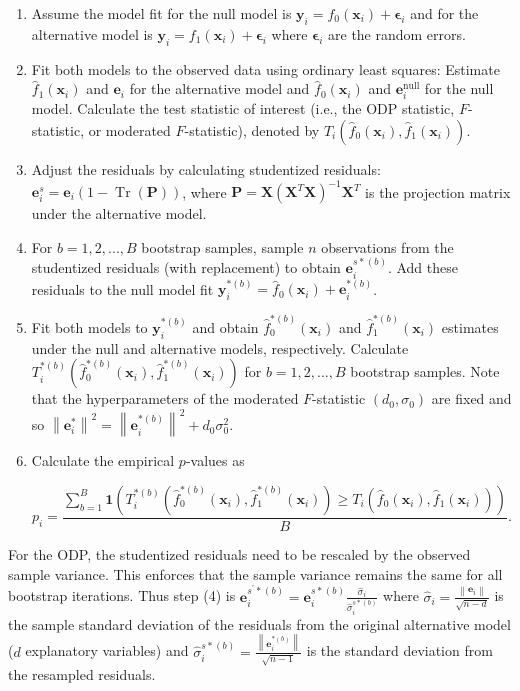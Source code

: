 \documentclass[11pt]{article}
\DeclareMathOperator{\Tr}{Tr}
\begin{document}
\begin{enumerate}
\item Assume the model fit for the null model is $\mathbf{y}_{i} = f_{0}(\mathbf{x}_{i}) + \mathbf{\epsilon}_{i}$ and for the alternative model is $\mathbf{y}_{i} = f_{1}(\mathbf{x}_{i}) + \mathbf{\epsilon}_{i}$ where $\mathbf{\epsilon}_{i}$ are the random errors.
\item Fit both models to the observed data using ordinary least squares: Estimate $\hat{f}_{1}(\mathbf{x}_{i})$ and $\mathbf{e}_{i}$ for the alternative model and $\hat{f}_{0}(\mathbf{x}_{i})$ and $\mathbf{e}_{i}^{\text{null}}$ for the null model. Calculate the test statistic of interest (i.e., the ODP statistic, $F$-statistic, or moderated $F$-statistic), denoted by $T_{i}(\hat{f}_{0}(\mathbf{x}_{i}), \hat{f}_{1}(\mathbf{x}_{i}))$.
\item Adjust the residuals by calculating studentized residuals: $\mathbf{e}^{s}_{i}= \mathbf{e}_{i}(1-\Tr(\mathbf{P}))$, where $\mathbf{P} = \mathbf{X}(\mathbf{X}^{T}\mathbf{X})^{-1}\mathbf{X}^{T}$ is the projection matrix under the alternative model.
\item For $b=1,2,...,B$ bootstrap samples, sample $n$ observations from the studentized residuals (with replacement) to obtain $\mathbf{e}^{s*(b)}_{i}$. Add these residuals to the null model fit $\mathbf{y}^{*(b)}_{i} = \hat{f}_{0}(\mathbf{x}_{i}) + \mathbf{e}^{*(b)}_{i}$.
\item  Fit both models to $\mathbf{y}^{*(b)}_{i}$ and obtain $\hat{f}^{*(b)}_{0}(\mathbf{x}_{i})$ and $\hat{f}^{*(b)}_{1}(\mathbf{x}_{i})$ estimates under the null and alternative models, respectively. Calculate $T^{*(b)}_{i}(\hat{f}^{*(b)}_{0}(\mathbf{x}_{i}), \hat{f}^{*(b)}_{1}(\mathbf{x}_{i}))$ for $b = 1,2,...,B$ bootstrap samples. Note that the hyperparameters of the moderated $F$-statistic $(d_{0}, \sigma_{0})$ are fixed and so $\left\lVert\mathbf{e}^{*}_{i}\right\rVert ^ {2} = \left\lVert \mathbf{e}^{*(b)}_{i} \right\rVert ^ {2} + d_{0}\sigma_{0}^{2}$.
\item Calculate the empirical $p$-values as

$$
p_{i} = \dfrac{\sum_{b=1}^{B} \mathbf{1}\left(T^{*(b)}_{i}(\hat{f}^{*(b)}_{0}(\mathbf{x}_{i}), \hat{f}^{*(b)}_{1}(\mathbf{x}_{i})) \geq T_{i}(\hat{f}_{0}(\mathbf{x}_{i}), \hat{f}_{1}(\mathbf{x}_{i}))\right) }{B}.
$$
\end{enumerate}

For the ODP, the studentized residuals need to be rescaled by the observed sample variance. This enforces that the sample variance remains the same for all bootstrap iterations. Thus step (4) is  $\mathbf{e}^{s^{\prime}*(b)}_{i} = \mathbf{e}^{s*(b)}_{i}\frac{\hat{\sigma}_{i} }{\hat{\sigma}^{s*(b)}_{i}}$ where $\hat{\sigma}_{i} = \frac{\left\lVert\mathbf{e}_{i}\right\rVert }{\sqrt{n-d}}$ is the sample standard deviation of the residuals from the original alternative model ($d$ explanatory variables) and $\hat{\sigma}^{s*(b)}_{i} = \frac{\left\lVert\mathbf{e}^{*(b)}_{i}\right\rVert }{\sqrt{n-1}}$ is the standard deviation from the resampled residuals.
\end{document}
